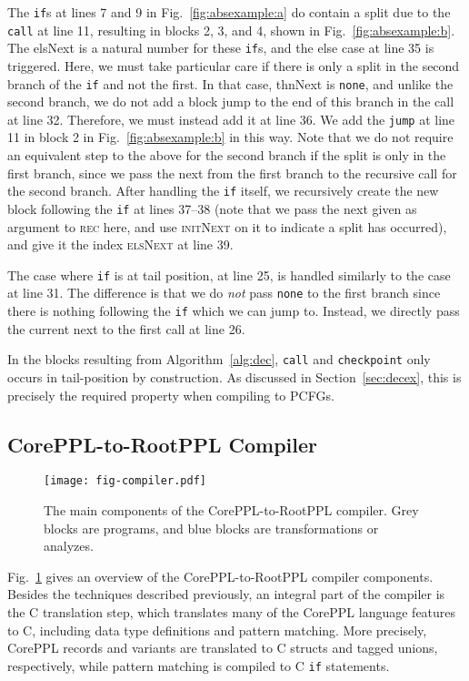 \documentclass[runningheads]{llncs}
\newcommand{\rlstinline}{\lstinline[language=RootPPL]}
\newcommand{\ttt}{\texttt}
\begin{document}
The \ttt{if}s at lines 7 and 9 in Fig.~\ref{fig:absexample:a} do contain a split due to the \ttt{call} at line 11, resulting in blocks 2, 3, and 4, shown in Fig.~\ref{fig:absexample:b}.
The \textsf{elsNext} is a natural number for these \ttt{if}s, and the else case at line 35 is triggered.
Here, we must take particular care if there is only a split in the second branch of the \ttt{if} and not the first.
In that case, \textsf{thnNext} is \ttt{none}, and unlike the second branch, we do not add a block jump to the end of this branch in the call at line 32.
Therefore, we must instead add it at line 36.
We add the \ttt{jump} at line 11 in block 2 in Fig.~\ref{fig:absexample:b} in this way.
Note that we do not require an equivalent step to the above for the second branch if the split is only in the first branch, since we pass the \textsf{next} from the first branch to the recursive call for the second branch.
After handling the \ttt{if} itself, we recursively create the new block following the \texttt{if} at lines 37--38 (note that we pass the \textsf{next} given as argument to \textsc{rec} here, and use \textsc{initNext} on it to indicate a split has occurred), and give it the index \textsc{elsNext} at line 39.

The case where \ttt{if} is at tail position, at line 25, is handled similarly to the case at line 31.
The difference is that we do \emph{not} pass \ttt{none} to the first branch since there is nothing following the \ttt{if} which we can jump to.
Instead, we directly pass the current \textsf{next} to the first call at line 26.

In the blocks resulting from Algorithm~\ref{alg:dec}, \ttt{call} and \ttt{checkpoint} only occurs in tail-position by construction.
As discussed in Section~\ref{sec:decex}, this is precisely the required property when compiling to PCFGs.


\subsection{CorePPL-to-RootPPL Compiler}\label{sec:cpplcompile}
\begin{figure}[tb]
\centering
\texttt{[image: fig-compiler.pdf]}
\caption{%
  The main components of the CorePPL-to-RootPPL compiler.
  Grey blocks are programs, and blue blocks are transformations or analyzes.
}
\label{fig:compiler-overview}
\end{figure}
Fig.~\ref{fig:compiler-overview} gives an overview of the CorePPL-to-RootPPL compiler components.
Besides the techniques described previously, an integral part of the compiler is the C translation step, which translates many of the CorePPL language features to C, including data type definitions and pattern matching.
More precisely, CorePPL records and variants are translated to C structs and tagged unions, respectively, while pattern matching is compiled to C \rlstinline!if! statements.
\end{document}
